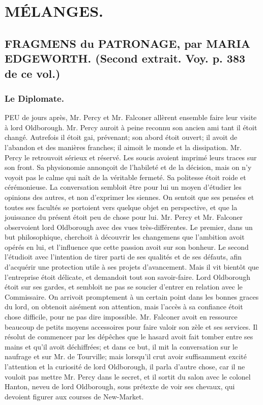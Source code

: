 \setcounter{page}{512}
\chapter{MÉLANGES.}
\section{FRAGMENS du PATRONAGE, par MARIA EDGEWORTH. \large{(Second extrait. Voy. p. 383 de ce vol.)}}
\subsection{Le Diplomate.}
PEU de jours après, Mr. Percy et Mr. Falconer allèrent ensemble faire leur visite à lord Oldborough. Mr. Percy auroit à peine reconnu son ancien ami tant il étoit changé. Autrefois il étoit gai, prévenant; son abord étoit ouvert; il avoit de l’abandon et des manières franches; il aimoit le monde et la dissipation.
Mr. Percy le retrouvoit sérieux et réservé. Les soucis avoient imprimé leurs traces sur son front. Sa physionomie annonçoit de l’habileté et de la décision, mais on n’y voyoit pas le calme qui naît de la véritable fermeté. Sa politesse étoit roide et cérémonieuse. La conversation sembloit être pour lui un moyen d’étudier les opinions des autres, et non d’exprimer les siennes. On sentoit que ses pensées et toutes ses facultés se portoient vers quelque objet en perspective, et que la jouissance du présent étoit peu de chose pour lui.\setcounter{page}{513}
Mr. Percy et Mr. Falconer observoient lord Oldborough avec des vues très-différentes. Le premier, dans un but philosophique, cherchoit à découvrir les changemens que l'ambition avoit opérés en lui, et l'influence que cette passion avoit sur son bonheur. Le second l'étudioit avec l'intention de tirer parti de ses qualités et de ses défauts, afin d'acquérir une protection utile à ses projets d'avancement. Mais il vit bientôt que l'entreprise étoit délicate, et demandoit tout son savoir-faire. Lord Oldborough étoit sur ses gardes, et sembloit ne pas se soucier d'entrer en relation avec le Commissaire.
On arrivoit promptement à un certain point dans les bonnes graces du lord, on obtenoit aisément son attention, mais l'accès à sa confiance étoit chose difficile, pour ne pas dire impossible.
Mr. Falconer avoit en ressource beaucoup de petits moyens accessoires pour faire valoir son zèle et ses services. Il résolut de commencer par les dépêches que le hasard avoit fait tomber entre ses mains et qu'il avoit déchiffrées; et dans ce but, il mit la conversation sur le naufrage et sur Mr. de Tourville; mais lorsqu'il crut avoir suffisamment excité l'attention et la curiosité de lord Oldborough, il parla d'autre chose, car il ne\setcounter{page}{514} vouloit pas mettre Mr. Percy dans le secret, et il sortit du salon avec le colonel Hanton, neveu de lord Oldborough, sous prétexte de voir ses chevaux, qui devoient figurer aux courses de New-Market.
